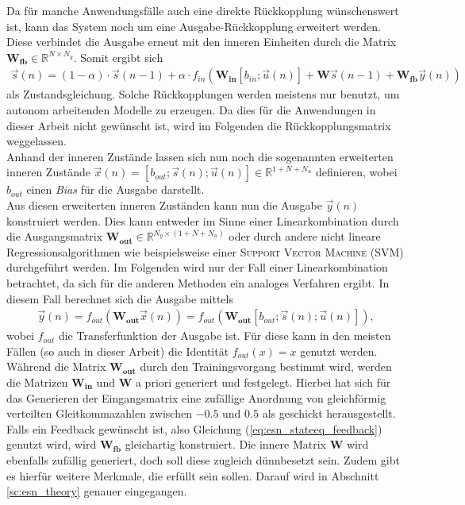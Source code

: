 Da für manche Anwendungsfälle auch eine direkte Rückkopplung wünschenswert ist, kann das System noch um eine Ausgabe-Rückkopplung erweitert werden. Diese verbindet die Ausgabe erneut mit den inneren Einheiten durch die Matrix $\mathbf{W_{fb}} \in \mathbb{R}^{N \times N_y}$.
Somit ergibt sich 
\begin{align}
\label{eq:esn_stateeq_feedback}
\vec{s}(n) = (1 - \alpha) \cdot \vec{s}(n-1) + \alpha \cdot f_{in}\left( \mathbf{W_{in}} [b_{in}; \vec{u}(n)] + \mathbf{W} \vec{s}(n-1) + \mathbf{W_{fb}} \vec{y}(n) \right)
\end{align}
als Zustandsgleichung. Solche Rückkopplungen werden meistens nur benutzt, um autonom arbeitenden Modelle zu erzeugen. Da dies für die Anwendungen in dieser Arbeit nicht gewünscht ist, wird im Folgenden die Rückkopplungsmatrix weggelassen.\\

Anhand der inneren Zustände lassen sich nun noch die sogenannten erweiterten inneren Zustände $\vec{x}(n) = [b_{out}; \vec{s}(n); \vec{u}(n)] \in \mathbb{R}^{1 + N + N_u}$ definieren, wobei $b_{out}$ einen \textit{Bias} für die Ausgabe darstellt.\\

Aus diesen erweiterten inneren Zuständen kann nun die Ausgabe $\vec{y}(n)$ konstruiert werden. Dies kann entweder im Sinne einer Linearkombination durch die Ausgangsmatrix $\mathbf{W_{out}} \in \mathbb{R}^{ N_y \times (1 + N + N_u)}$ oder durch andere nicht lineare Regressionsalgorithmen wie beispielsweise einer \textsc{Support Vector Machine (SVM)} durchgeführt werden. Im Folgenden wird nur der Fall einer Linearkombination betrachtet, da sich für die anderen Methoden ein analoges Verfahren ergibt.
In diesem Fall berechnet sich die Ausgabe mittels
\begin{align}
\vec{y}(n) = f_{out} \left( \mathbf{W_{out}} \vec{x}(n) \right) = f_{out} \left(\mathbf{W_{out}} [b_{out}; \vec{s}(n); \vec{u}(n)] \right),
\end{align}
wobei $f_{out}$ die Transferfunktion der Ausgabe ist. Für diese kann in den meisten Fällen (so auch in dieser Arbeit) die Identität $f_{out}(x) = x$ genutzt werden.\\

Während die Matrix $\mathbf{W_{out}}$ durch den Trainingsvorgang bestimmt wird, werden die Matrizen $\mathbf{W_{in}}$ und $\mathbf{W}$ a priori generiert und festgelegt. Hierbei hat sich für das Generieren der Eingangsmatrix eine zufällige Anordnung von gleichförmig verteilten Gleitkommazahlen zwischen $-0.5$ und $0.5$ als geschickt herausgestellt. Falls ein Feedback gewünscht ist, also Gleichung (\ref{eq:esn_stateeq_feedback}) genutzt wird, wird $\mathbf{W_{fb}}$ gleichartig konstruiert. Die innere Matrix $\mathbf{W}$ wird ebenfalls zufällig generiert, doch soll diese zugleich dünnbesetzt sein. Zudem gibt es hierfür weitere Merkmale, die erfüllt sein sollen. Darauf wird in Abschnitt \ref{sc:esn_theory} genauer eingegangen.

